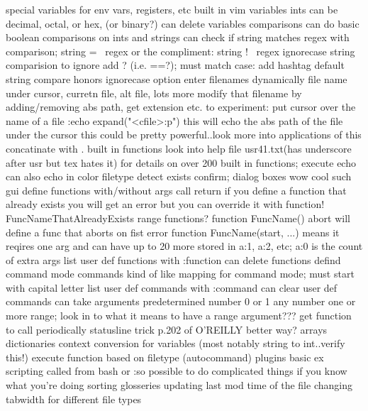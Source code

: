 \documentclass[12pt]{book}
\begin{document}
{{      special variables for env vars, registers, etc
      built in vim variables
      ints can be decimal, octal, or hex, (or binary?)
      can delete variables
    comparisons
      can do basic boolean comparisons on ints and strings
      can check if string matches regex with comparison; string =~ regex or the compliment: string !~ regex
      ignorecase string comparision
        to ignore add ? (i.e. ==?); must match case: add hashtag
        default string compare honors ignorecase option
    enter filenames dynamically
      file name under cursor, curretn file, alt file, lots more
      modify that filename by adding/removing abs path, get extension etc.
      to experiment:
        put cursor over the name of a file
        :echo expand("<cfile>:p")
        this will echo the abs path of the file under the cursor
        this could be pretty powerful..look more into applications of this
    concatinate with .
    built in functions
      look into help file usr41.txt(has underscore after usr but tex hates it) for details on over 200 built in functions;
      execute
      echo
        can also echo in color
      filetype detect
      exists
      confirm; dialog boxes wow cool such gui
    define functions
      with/without args
      call
      return
      if you define a function that already exists you will get an error but you can override it with function! FuncNameThatAlreadyExists
      range functions?
      function FuncName() abort will define a func that aborts on fist error
      function FuncName(start, ...) means it reqires one arg and can have up to 20 more stored in a:1, a:2, etc; a:0 is the count of extra args
      list user def functions with :function
      can delete functions
    defind command mode commands
      kind of like mapping for command mode; must start with capital letter
      list user def commands with :command
      can clear user def commands
      can take arguments
        predetermined number
        0 or 1
        any number
        one or more
        range; look in to what it means to have a range argument???
    get function to call periodically
      statusline trick p.202 of O'REILLY
      better way?
    arrays
    dictionaries
    context conversion for variables (most notably string to int..verify this!)
    execute function based on filetype (autocommand)
    plugins
    basic ex scripting called from bash or :so
      possible to do complicated things if you know what you're doing
        sorting glosseries
        updating last mod time of the file
        changing tabwidth for different file types
}}
\end{document}
